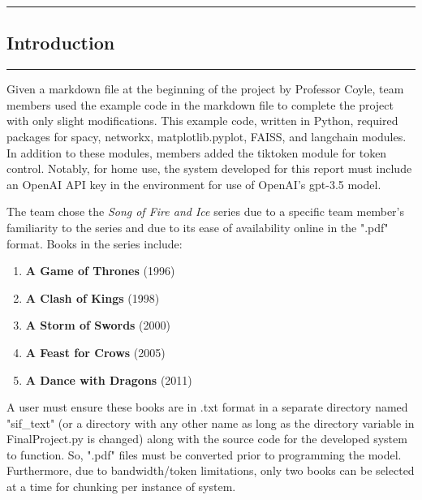 \newpage
{\color{gray}\hrule}
\begin{center}
\section{Introduction}
\bigskip
\end{center}
{\color{gray}\hrule}

Given a markdown file at the beginning of the project by Professor Coyle, team members used the example code in the markdown file to complete the project with only slight modifications. This example code, written in Python, required packages for spacy, networkx, matplotlib.pyplot, FAISS, and langchain modules. In addition to these modules, members added the tiktoken module for token control. Notably, for home use, the system developed for this report must include an OpenAI API key in the environment for use of OpenAI's gpt-3.5 model.\par
The team chose the \textit{Song of Fire and Ice} series due to a specific team member's familiarity to the series and due to its ease of availability online in the ".pdf" format. Books in the series include: \bigskip

\begin{enumerate}[label=\arabic*.]
    \item \textbf{A Game of Thrones} (1996)
    \item \textbf{A Clash of Kings} (1998)
    \item \textbf{A Storm of Swords} (2000)
    \item \textbf{A Feast for Crows} (2005)
    \item \textbf{A Dance with Dragons} (2011)
\end{enumerate}
\bigskip
A user must ensure these books are in .txt format in a separate directory named "sif\_text" (or a directory with any other name as long as the directory variable in FinalProject.py is changed) along with the source code for the developed system to function. So, ".pdf" files must be converted prior to programming the model. Furthermore, due to bandwidth/token limitations, only two books can be selected at a time for chunking per instance of system.
\bigskip